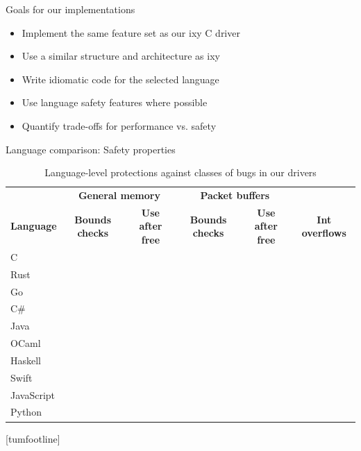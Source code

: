 \documentclass[NET,english,aspectratio=169,notitleframe]{tumbeamer}
\newcommand{\xmark}{\textcolor{TUMDarkRed}{\ding{55}}}%
\begin{document}
\begin{frame}{Goals for our implementations}
\begin{itemize}
\item Implement the same feature set as our ixy C driver
\item Use a similar structure and architecture as ixy
\item Write idiomatic code for the selected language
\item Use language safety features where possible
\item Quantify trade-offs for performance vs. safety
\end{itemize}
\end{frame}




\begin{frame}{Language comparison: Safety properties}
\begin{table}[t]
 \setlength{\tabcolsep}{1.3mm}
	\centering
	\footnotesize
	\begin{tabular}{lccccc}
		& \multicolumn{2}{c}{\textbf{General memory}} & \multicolumn{2}{c}{\hspace{-1em}\textbf{Packet buffers}}  \\
		\textbf{Language} & \textbf{Bounds checks} & \textbf{Use after free}  & \textbf{Bounds checks} & \textbf{Use after free} & \textbf{Int overflows} \\
		\toprule
		C & \xmark & \xmark & \xmark & \xmark & \xmark \\
		Rust & &  &  &  &  \\
		Go  & &  &  &  &  \\
		C\#  & &  &  &  &  \\
		Java & & & & & \\
		OCaml  & &  &  &  &  \\
		Haskell  & &  &  &  &  \\
		Swift  & &  &  &  &  \\
		JavaScript & & & & & \\
		Python  & &  &  &  &  \\
		\bottomrule
	\end{tabular}
	\caption{Language-level protections against classes of bugs in our drivers}
	\label{tbl:lang-safety}
	\vspace{-3em}
\end{table}
\end{frame}
[tumfootline]
\end{document}
